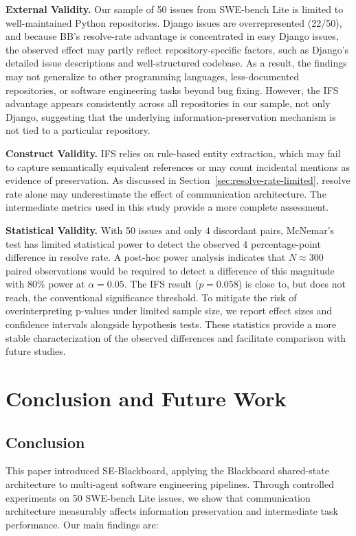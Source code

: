 \documentclass{ieeeaccess}
\begin{document}
\textbf{External Validity.} Our sample of 50 issues from SWE-bench Lite is limited to well-maintained Python repositories. Django issues are overrepresented (22/50), and because BB's resolve-rate advantage is concentrated in easy Django issues, the observed effect may partly reflect repository-specific factors, such as Django's detailed issue descriptions and well-structured codebase. As a result, the findings may not generalize to other programming languages, less-documented repositories, or software engineering tasks beyond bug fixing. However, the IFS advantage appears consistently across all repositories in our sample, not only Django, suggesting that the underlying information-preservation mechanism is not tied to a particular repository.

\textbf{Construct Validity.} IFS relies on rule-based entity extraction, which may fail to capture semantically equivalent references or may count incidental mentions as evidence of preservation. As discussed in Section~\ref{sec:resolve-rate-limited}, resolve rate alone may underestimate the effect of communication architecture. The intermediate metrics used in this study provide a more complete assessment.

\textbf{Statistical Validity.} With 50 issues and only 4 discordant pairs, McNemar's test has limited statistical power to detect the observed 4 percentage-point difference in resolve rate. A post-hoc power analysis indicates that $N \approx 300$ paired observations would be required to detect a difference of this magnitude with 80\% power at $\alpha = 0.05$. The IFS result ($p = 0.058$) is close to, but does not reach, the conventional significance threshold. To mitigate the risk of overinterpreting p-values under limited sample size, we report effect sizes and confidence intervals alongside hypothesis tests. These statistics provide a more stable characterization of the observed differences and facilitate comparison with future studies.

\section{Conclusion and Future Work}

\subsection{Conclusion}

This paper introduced SE-Blackboard, applying the Blackboard shared-state architecture to multi-agent software engineering pipelines. Through controlled experiments on 50 SWE-bench Lite issues, we show that communication architecture measurably affects information preservation and intermediate task performance. Our main findings are:
\end{document}
